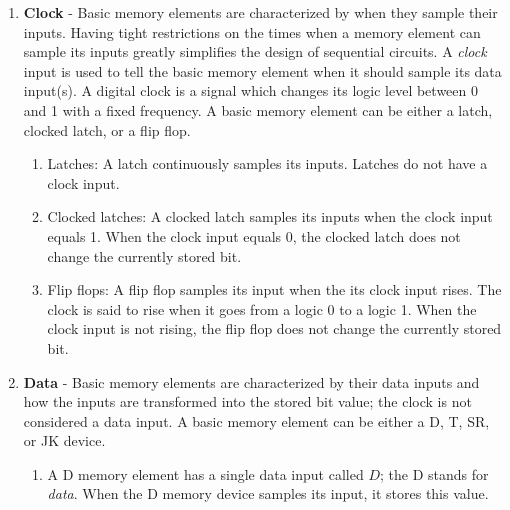 \begin{enumerate}
    \item \textbf{ Clock} - Basic memory elements are characterized by
        when they sample their inputs.  Having tight restrictions on the
        times when a memory element can sample its inputs greatly
        simplifies the design of sequential circuits.  A \textit{ clock}
        input is used to tell the basic memory element when it should sample
        its data input(s).  A digital clock is a signal which
        changes its logic level between 0 and 1 with a fixed frequency.
        A basic memory element can be either a latch, clocked latch, or
        a flip flop.

        \begin{enumerate}

            \item Latches: A latch continuously samples its inputs.
                Latches do not have a clock input.

            \item Clocked latches: A clocked latch samples its inputs when
                the clock input equals 1.  When the clock input equals 0, the
                clocked latch does not change the currently stored bit.

            \item Flip flops: A flip flop samples its input when the its
                clock input rises.  The clock is said to rise when it goes
                from a logic 0 to a logic 1.  When the clock input is not rising,
                the flip flop does not change the currently stored bit.
        \end{enumerate}

    \item \textbf{ Data} - Basic memory elements are characterized by
        their data inputs and how the inputs are transformed into the
        stored bit value; the clock is not considered a data input.
        A basic memory element can be either a D, T, SR, or JK device.

        \begin{enumerate}

            \item
                A D memory element has a single data input called $D$;
                the D stands for \textit{ data}.  When the
                D memory device samples its input, it stores this value.


\end{enumerate}
\end{enumerate}
